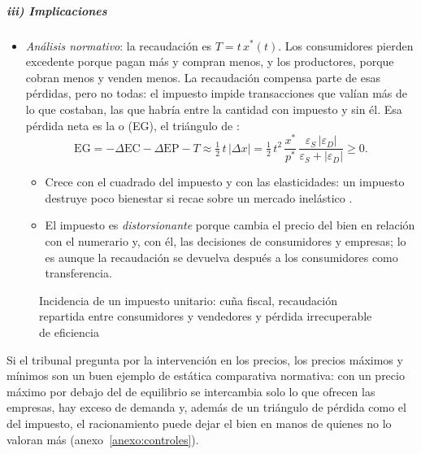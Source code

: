 \documentclass[11pt]{article}
\begin{document}
\subparagraph{iii) Implicaciones}

\begin{itemize}
\item \emph{Análisis normativo}: la recaudación es $T=t\,x^*(t)$. Los consumidores pierden excedente porque pagan más y compran menos, y los productores, porque cobran menos y venden menos. La recaudación compensa parte de esas pérdidas, pero no todas: el impuesto impide transacciones que valían más de lo que costaban, las que habría entre la cantidad con impuesto y sin él. Esa pérdida neta es la  o  (EG), el triángulo de \textcite{Harberger1964Measurement}:
  \begin{equation}
  \mathrm{EG}=-\Delta\mathrm{EC}-\Delta\mathrm{EP}-T\approx\tfrac12\,t\,\lvert\Delta x\rvert=\tfrac12\,t^2\,\frac{x^*}{p^*}\,\frac{\varepsilon_S\,\lvert\varepsilon_D\rvert}{\varepsilon_S+\lvert\varepsilon_D\rvert}\geq 0. \label{eq:exceso-gravamen}
  \end{equation}
  \begin{itemize}
  \item Crece con el cuadrado del impuesto y con las elasticidades: un impuesto destruye poco bienestar si recae sobre un mercado inelástico .
  \item El impuesto es \emph{distorsionante} porque cambia el precio del bien en relación con el numerario y, con él, las decisiones de consumidores y empresas; lo es aunque la recaudación se devuelva después a los consumidores como transferencia.
  \end{itemize}
\end{itemize}

\begin{figure}[H]
\centering
\caption{Incidencia de un impuesto unitario: cuña fiscal, recaudación repartida entre consumidores y vendedores y pérdida irrecuperable de eficiencia}\label{fig:incidencia}
\end{figure}

\begin{notaopositor}
Si el tribunal pregunta por la intervención en los precios, los precios máximos y mínimos son un buen ejemplo de estática comparativa normativa: con un precio máximo por debajo del de equilibrio se intercambia solo lo que ofrecen las empresas, hay exceso de demanda y, además de un triángulo de pérdida como el del impuesto, el racionamiento puede dejar el bien en manos de quienes no lo valoran más (anexo~\ref{anexo:controles}).
\end{notaopositor}
\end{document}
